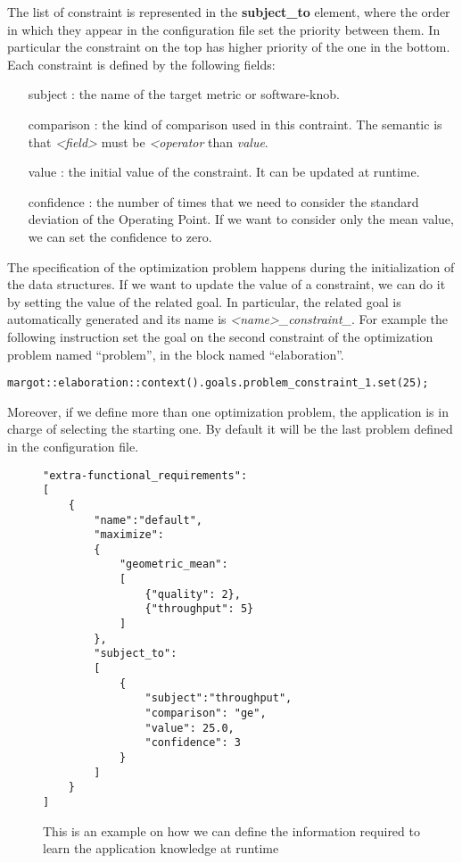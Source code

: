 The list of constraint is represented in the \textbf{subject\_to} element, where the order in which they appear in the configuration file set the priority between them.
In particular the constraint on the top has higher priority of the one in the bottom.
Each constraint is defined by the following fields:
\begin{itemize}
	\item[subject]: the name of the target metric or software-knob.
	\item[comparison]: the kind of comparison used in this contraint. The semantic is that \textit{<field>} must be \textit{<operator} than \textit{value}.
	\item[value]: the initial value of the constraint. It can be updated at runtime.
	\item[confidence]: the number of times that we need to consider the standard deviation of the Operating Point. If we want to consider only the mean value, we can set the confidence to zero.
\end{itemize}


The specification of the optimization problem happens during the initialization of the data structures.
If we want to update the value of a constraint, we can do it by setting the value of the related goal.
In particular, the related goal is automatically generated and its name is \textit{<name>\_constraint\_<index constraint>}.
For example the following instruction set the goal on the second constraint of the optimization problem named ``problem'', in the block named ``elaboration''.
\begin{lstlisting}
margot::elaboration::context().goals.problem_constraint_1.set(25);
\end{lstlisting}
Moreover, if we define more than one optimization problem, the application is in charge of selecting the starting one.
By default it will be the last problem defined in the configuration file.


\begin{figure}
\lstset{language=json}
\begin{lstlisting}
"extra-functional_requirements":
[
	{
		"name":"default",
		"maximize":
		{
			"geometric_mean":
			[
				{"quality": 2},
				{"throughput": 5}
			]
		},
		"subject_to":
		[
			{
				"subject":"throughput",
				"comparison": "ge",
				"value": 25.0,
				"confidence": 3
			}
		]
	}
]
\end{lstlisting}
\caption{This is an example on how we can define the information required to learn the application knowledge at runtime}
\label{code:agora}
\end{figure}



